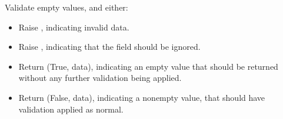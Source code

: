 \documentclass[letterpaper,10pt,english]{sphinxmanual}
\begin{document}
\begin{fulllineitems}
\begin{fulllineitems}
\label{\detokenize{tasks:tasks.serializers.TaskSerializer.url_field_name}}
\pysigstartsignatures
{}
\pysigstopsignatures
\end{fulllineitems}


\begin{fulllineitems}
\label{\detokenize{tasks:tasks.serializers.TaskSerializer.validate}}
\pysigstartsignatures
{}
\pysigstopsignatures
\end{fulllineitems}


\begin{fulllineitems}
\label{\detokenize{tasks:tasks.serializers.TaskSerializer.validate_empty_values}}
\pysigstartsignatures
{}
\pysigstopsignatures
\sphinxAtStartPar
Validate empty values, and either:
\begin{itemize}
\item {} 
\sphinxAtStartPar
Raise , indicating invalid data.

\item {} 
\sphinxAtStartPar
Raise , indicating that the field should be ignored.

\item {} 
\sphinxAtStartPar
Return (True, data), indicating an empty value that should be
returned without any further validation being applied.

\item {} 
\sphinxAtStartPar
Return (False, data), indicating a non\sphinxhyphen{}empty value, that should
have validation applied as normal.

\end{itemize}

\end{fulllineitems}


\end{fulllineitems}
\end{document}
